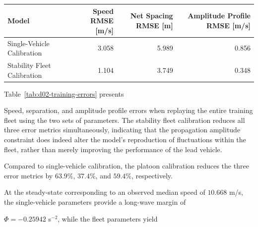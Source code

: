 \documentclass[11pt,a4paper,openany]{book}
\numberwithin{equation}{chapter}
\numberwithin{figure}{chapter}
\numberwithin{table}{chapter}
\newcommand{\tabletext}[2]{%
  \par\smallskip\noindent
  Table~\ref{#1} presents #2
\par\smallskip
}
\begin{document}
\begin{center}
\small
{}
\label{tab:d02-training-errors}
\begin{tabular}{p{3.7cm}rrr}
\toprule
\textbf{Model} &




Speed RMSE [m/s]& Net Spacing RMSE [m]




&




Amplitude Profile RMSE [m/s]



\\
\midrule







Single-Vehicle Calibration




& 3.058 & 5.989 & 0.856\\







Stability Fleet Calibration




& 1.104 & 3.749 & 0.348\\
\bottomrule
\end{tabular}
\end{center}
\tabletext{tab:d02-training-errors}{




Speed, separation, and amplitude profile errors when replaying the entire training fleet using the two sets of parameters. The stability fleet calibration reduces all three error metrics simultaneously, indicating that the propagation amplitude constraint does indeed alter the model’s reproduction of fluctuations within the fleet, rather than merely improving the performance of the lead vehicle.
}







Compared to single-vehicle calibration, the platoon calibration reduces the three error metrics by $63.9\%$, $37.4\%$, and $59.4\%$, respectively.

At the steady-state corresponding to an observed median speed of $10.668$ m/s, the single-vehicle parameters provide a long-wave margin of

$\Phi=-0.25942$ s$^{-2}$, while the fleet parameters yield
\end{document}

